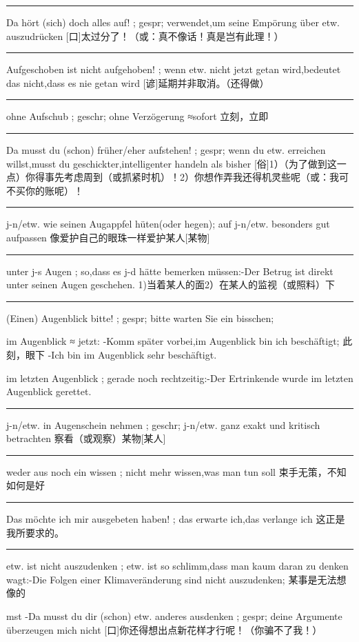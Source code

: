 \noindent\rule{\textwidth}{1pt}  
Da hört (sich) doch alles auf! ; gespr; verwendet,um seine Empörung über etw. auszudrücken
[口]太过分了！（或：真不像话！真是岂有此理！）

\noindent\rule{\textwidth}{1pt}  
Aufgeschoben ist nicht aufgehoben! ; wenn etw. nicht jetzt getan wird,bedeutet das nicht,dass es nie getan wird
[谚]延期并非取消。（还得做）

\noindent\rule{\textwidth}{1pt}  
ohne Aufschub ; geschr; ohne Verzögerung ≈sofort
立刻，立即

\noindent\rule{\textwidth}{1pt}  
Da musst du (schon) früher/eher aufstehen! ; gespr; wenn du etw. erreichen willst,musst du geschickter,intelligenter handeln als bisher
[俗]1）（为了做到这一点）你得事先考虑周到（或抓紧时机）！2）你想作弄我还得机灵些呢（或：我可不买你的账呢）！

\noindent\rule{\textwidth}{1pt}  
j-n/etw. wie seinen Augappfel hüten(oder hegen); auf j-n/etw. besonders gut aufpassen
像爱护自己的眼珠一样爱护某人[某物]

\noindent\rule{\textwidth}{1pt}  
unter j-s Augen ; so,dass es j-d hätte bemerken müssen:-Der Betrug ist direkt unter seinen Augen geschehen.
1)当着某人的面2）在某人的监视（或照料）下

\noindent\rule{\textwidth}{1pt}  
(Einen) Augenblick bitte! ; gespr; bitte warten Sie ein bisschen;

im Augenblick ≈ jetzt: -Komm später vorbei,im Augenblick bin ich beschäftigt;
此刻，眼下
-Ich bin im Augenblick sehr beschäftigt.

im letzten Augenblick ; gerade noch rechtzeitig:-Der Ertrinkende wurde im letzten Augenblick gerettet.

\noindent\rule{\textwidth}{1pt}  
j-n/etw. in Augenschein nehmen ; geschr; j-n/etw. ganz exakt und kritisch betrachten
察看（或观察）某物[某人]

\noindent\rule{\textwidth}{1pt}  
weder aus noch ein wissen ; nicht mehr wissen,was man tun soll
束手无策，不知如何是好

\noindent\rule{\textwidth}{1pt}  
Das möchte ich mir ausgebeten haben! ; das erwarte ich,das verlange ich
这正是我所要求的。

\noindent\rule{\textwidth}{1pt}  
etw. ist nicht auszudenken ; etw. ist so schlimm,dass man kaum daran zu denken wagt:-Die Folgen einer Klimaveränderung sind nicht auszudenken;
某事是无法想像的

mst -Da musst du dir (schon) etw. anderes ausdenken ; gespr; deine Argumente überzeugen mich nicht
[口]你还得想出点新花样才行呢！（你骗不了我！）

